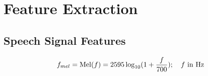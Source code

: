 \chapter{Feature Extraction}
\label{chapter:feature}

\section{Speech Signal Features}
\label{setion:feature-1}

\begin{equation}
\label{eq:mel-function}
f_{mel} = \operatorname{Mel}(f) = 2595 \log_{10} (1 + \frac{f}{700}); \quad f \text{ in Hz}
\end{equation}
